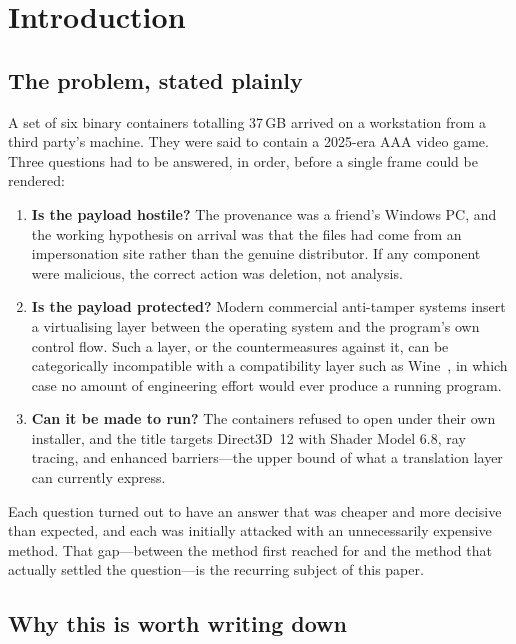 \section{Introduction}

\subsection{The problem, stated plainly}

A set of six binary containers totalling 37\,GB arrived on a workstation from a
third party's machine. They were said to contain a 2025-era AAA video game. Three
questions had to be answered, in order, before a single frame could be rendered:

\begin{enumerate}
\item \textbf{Is the payload hostile?} The provenance was a friend's Windows PC,
      and the working hypothesis on arrival was that the files had come from an
      impersonation site rather than the genuine distributor. If any component
      were malicious, the correct action was deletion, not analysis.
\item \textbf{Is the payload protected?} Modern commercial anti-tamper systems
      insert a virtualising layer between the operating system and the program's
      own control flow. Such a layer, or the countermeasures against it, can be
      categorically incompatible with a compatibility layer such as
      Wine~\cite{wine}, in which case no amount of engineering effort would ever
      produce a running program.
\item \textbf{Can it be made to run?} The containers refused to open under their
      own installer, and the title targets Direct3D~12 with Shader Model 6.8,
      ray tracing, and enhanced barriers---the upper bound of what a translation
      layer can currently express.
\end{enumerate}

Each question turned out to have an answer that was cheaper and more decisive
than expected, and each was initially attacked with an unnecessarily expensive
method. That gap---between the method first reached for and the method that
actually settled the question---is the recurring subject of this paper.

\subsection{Why this is worth writing down}

